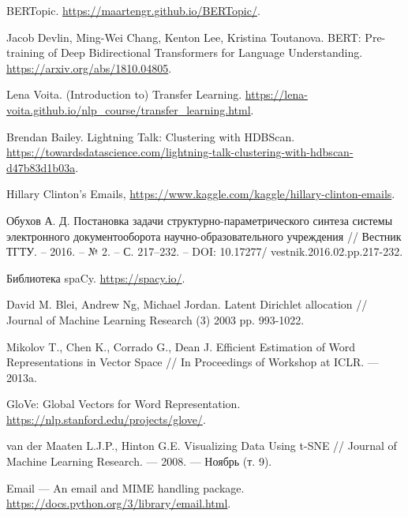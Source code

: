 \documentclass[a4paper,14pt]{extreport}
\begin{document}
  
%  
  
  



  \setcounter{page}{2}

  {
    \renewcommand{\contentsname}{Содержание}
    \tableofcontents
  } 
 
  
  
  
 
  

  

  
  
  
  
  
  
  

\begin{thebibliography}{3}

BERTopic. \url{https://maartengr.github.io/BERTopic/}.

Jacob Devlin, Ming-Wei Chang, Kenton Lee, Kristina Toutanova. BERT: Pre-training of Deep Bidirectional Transformers for Language Understanding. 
\url{https://arxiv.org/abs/1810.04805}.

Lena Voita. 
(Introduction to) Transfer Learning. \url{https://lena-voita.github.io/nlp_course/transfer_learning.html}.

Brendan Bailey. Lightning Talk: Clustering with HDBScan. \url{https://towardsdatascience.com/lightning-talk-clustering-with-hdbscan-d47b83d1b03a}.

Hillary Clinton's Emails,
\url{https://www.kaggle.com/kaggle/hillary-clinton-emails}.

Обухов А. Д. Постановка задачи структурно-параметрического синтеза системы
электронного документооборота научно-образовательного учреждения // Вестник ТГТУ. –
2016. – № 2. – С. 217–232. – DOI: 10.17277/
vestnik.2016.02.pp.217-232.

Библиотека spaCy. \url{https://spacy.io/}.

David M. Blei, Andrew Ng, Michael Jordan. Latent Dirichlet allocation // Journal of Machine Learning Research (3) 2003 pp. 993-1022.

Mikolov T., Chen K., Corrado G., Dean J. Efficient Estimation of Word Representations in Vector Space // In Proceedings of Workshop at ICLR. — 2013a.

GloVe: Global Vectors for Word Representation. \url{https://nlp.stanford.edu/projects/glove/}.

van der Maaten L.J.P., Hinton G.E. Visualizing Data Using t-SNE // Journal of Machine Learning Research. — 2008. — Ноябрь (т. 9).

Email — An email and MIME handling package. \url{https://docs.python.org/3/library/email.html}.

\end{thebibliography}
\end{document}
